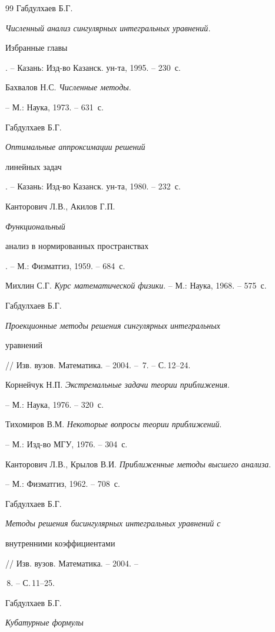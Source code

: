 \begin{thebibliography}{99}
Габдулхаев Б.Г. {\it Численный анализ сингулярных интегральных уравнений. 


Избранные главы}. -- Казань: Изд-во Казанск. ун-та, 1995. -- 230~с.




Бахвалов Н.С. {\it Численные методы}.


-- М.: Наука, 1973. -- 631~с.




Габдулхаев Б.Г. {\it Оптимальные аппроксимации решений


линейных задач}. -- Казань: Изд-во Казанск. ун-та, 1980. -- 232~с.




Канторович Л.В., Акилов Г.П. {\it Функциональный


анализ в нормированных пространствах}. -- М.: Физматгиз, 1959. -- 684~с.




Михлин С.Г. {\it Курс математической физики}. -- М.: Наука, 1968. -- 575~с.




Габдулхаев Б.Г. {\it Проекционные методы решения сингулярных интегральных 


уравнений} // Изв. вузов. Математика. -- 2004. -- \No\,7. -- С.\,12--24.




Корнейчук Н.П. {\it Экстремальные задачи теории приближения}.


-- М.: Наука, 1976. -- 320~с.




Тихомиров В.М. {\it Некоторые вопросы теории приближений}.


-- М.: Изд-во МГУ, 1976. -- 304~с.




Канторович Л.В., Крылов В.И. {\it Приближенные методы высшего анализа}.


-- М.: Физматгиз, 1962. -- 708~с.




Габдулхаев Б.Г. {\it Методы решения бисингулярных интегральных уравнений с 


внутренними коэффициентами} // Изв. вузов. Математика. -- 2004. -- 


\No\,8. -- С.\,11--25.




Габдулхаев Б.Г. {\it Кубатурные формулы


}
\end{thebibliography}
